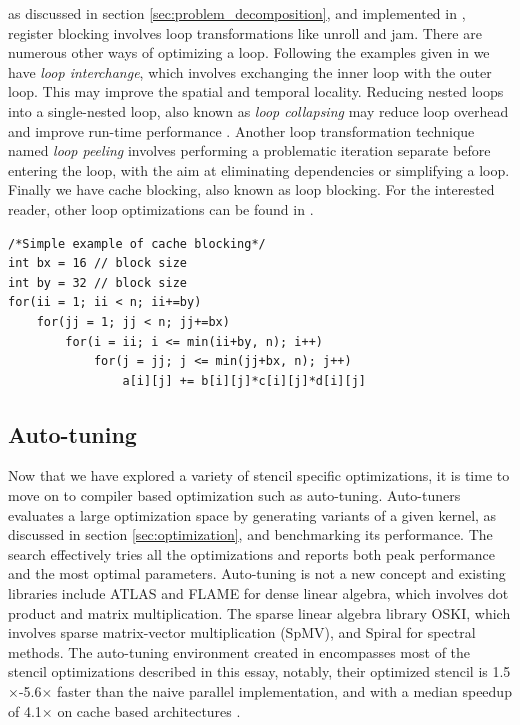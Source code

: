 as discussed in section \ref{sec:problem_decomposition}, and implemented in \cite{article1}, register blocking involves loop transformations like unroll and jam. There are numerous other ways of optimizing a loop. Following the examples given in \cite{article10} we have \textit{loop interchange}, which involves exchanging the inner loop with the outer loop. This may improve the spatial and temporal locality. Reducing nested loops into a single-nested loop, also known as \textit{loop collapsing} may reduce loop overhead and improve run-time performance \cite{article11}. Another loop transformation technique named \textit{loop peeling} involves performing a problematic iteration separate before entering the loop, with the aim at eliminating dependencies or simplifying a loop. Finally we have cache blocking, also known as loop blocking.  For the interested reader, other loop optimizations can be found in \cite{article12}.

\begin{lstlisting}[caption=Cache Blocking]
/*Simple example of cache blocking*/
int bx = 16 // block size
int by = 32 // block size
for(ii = 1; ii < n; ii+=by)
 	for(jj = 1; jj < n; jj+=bx)
     	for(i = ii; i <= min(ii+by, n); i++)
         	for(j = jj; j <= min(jj+bx, n); j++)
         		a[i][j] += b[i][j]*c[i][j]*d[i][j]
\end{lstlisting}

\subsection{Auto-tuning}
Now that we have explored a variety of stencil specific optimizations, it is time to move on to compiler based optimization such as auto-tuning. Auto-tuners evaluates a large optimization space by generating variants of a given kernel, as discussed in section \ref{sec:optimization}, and benchmarking its performance. The search effectively tries all the optimizations and reports both peak performance and the most optimal parameters. Auto-tuning is not a new concept and existing libraries include ATLAS and FLAME for dense linear algebra, which involves dot product and matrix multiplication. The sparse linear algebra library OSKI, which involves sparse matrix-vector multiplication (SpMV), and Spiral for spectral methods. The auto-tuning environment created in \cite{article1} encompasses most of the stencil optimizations described in this essay, notably, their optimized stencil is 1.5\(\times\)-5.6\(\times\) faster than the naive parallel implementation, and with a median speedup of 4.1\(\times\)  on cache based architectures \cite{article1}.

